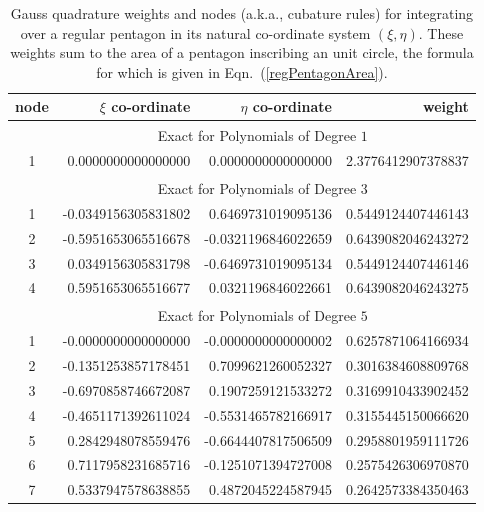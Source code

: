 \begin{table}
    \centering
    \begin{tabular}{|c|rrr|}
        \hline
        node & \centering $\xi$ co-ordinate \phantom{123}  & 
        $\eta$ co-ordinate \phantom{123} & weight \phantom{12345} \\ \hline
        & \multicolumn{3}{|c|}{Exact for Polynomials of Degree $1^{\phantom{|^|}}$} \\ \hline
        1 & 0.0000000000000000 & 0.0000000000000000 &
        2.3776412907378837\vphantom{$|^{|^|}$} \\ 
        \hline
        & \multicolumn{3}{|c|}{Exact for Polynomials of Degree $3^{\phantom{|^|}}$} \\ \hline
        1 & -0.0349156305831802 &  0.6469731019095136 &
        0.5449124407446143\vphantom{$|^{|^|}$} \\
        2 & -0.5951653065516678 & -0.0321196846022659 & 0.6439082046243272 \\
        3 &  0.0349156305831798 & -0.6469731019095134 & 0.5449124407446146 \\
        4 &  0.5951653065516677 &  0.0321196846022661 & 0.6439082046243275 \\ 
        \hline
        & \multicolumn{3}{|c|}{Exact for Polynomials of Degree $5^{\phantom{|^|}}$} \\ \hline
        1 & -0.0000000000000000 & -0.0000000000000002 &
        0.6257871064166934\vphantom{$|^{|^|}$} \\
        2 & -0.1351253857178451 &  0.7099621260052327 & 0.3016384608809768 \\
        3 & -0.6970858746672087 &  0.1907259121533272 & 0.3169910433902452 \\ 
        4 & -0.4651171392611024 & -0.5531465782166917 & 0.3155445150066620 \\
        5 &  0.2842948078559476 & -0.6644407817506509 & 0.2958801959111726 \\
        6 &  0.7117958231685716 & -0.1251071394727008 & 0.2575426306970870 \\
        7 &  0.5337947578638855 &  0.4872045224587945 & 0.2642573384350463 \\
        \hline
    \end{tabular}
    \caption{Gauss quadrature weights and nodes (a.k.a., cubature rules) for integrating over a regular pentagon in its natural co-ordinate system $( \xi , \eta )$.  These weights sum to the area of a pentagon inscribing an unit circle, the formula for which is given in Eqn.~(\ref{regPentagonArea}).}
    \label{tabQuadrature}
\end{table}

